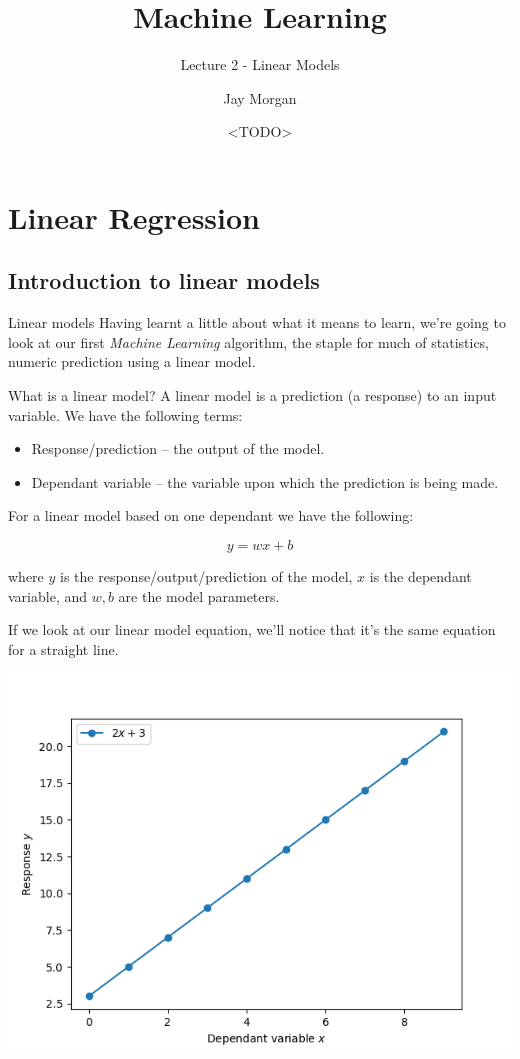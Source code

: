 \documentclass[10pt]{beamer}
\author{Jay Morgan}
\date{<TODO>}
\title{Machine Learning}
\subtitle{Lecture 2 - Linear Models}
\begin{document}
\maketitle

\section*{Linear Regression}
\label{sec:orged16787}

\subsection*{Introduction to linear models}
\label{sec:org4a5a1b9}

\begin{frame}[label={sec:org58e4148}]{Linear models}
Having learnt a little about what it means to learn, we're going to look at our first
\emph{Machine Learning} algorithm, the staple for much of statistics, numeric prediction
using a linear model.
\end{frame}

\begin{frame}[fragile,allowframebreaks,label=]{What is a linear model?}
A linear model is a prediction (a response) to an input variable. We have the
following terms:

\begin{itemize}
\item Response/prediction -- the output of the model.
\item Dependant variable -- the variable upon which the prediction is being made.
\end{itemize}

For a linear model based on one dependant we have the following:

\[
y = w x + b
\]

where \(y\) is the response/output/prediction of the model, \(x\) is the dependant
variable, and \(w, b\) are the model parameters.

If we look at our linear model equation, we'll notice that it's the same equation for a straight line.

\begin{center}
\includegraphics[width=.9\linewidth]{images/linear_model.png}
\end{center}
\end{frame}
\end{document}
